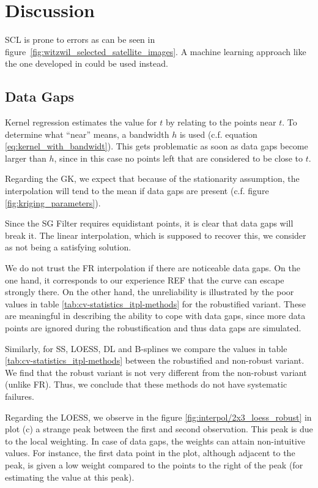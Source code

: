 \chapter{Discussion}

    SCL is prone to errors as can be seen in figure~\ref{fig:witzwil_selected_satellite_images}. A machine learning approach like the one developed in \cite{raiyaniSentinel2ImageScene2021} could be used instead.

\section{Data Gaps}\label{sec:discussion_itpl_data_gaps}

Kernel regression estimates the value for $t$ by relating to the points near $t$. To determine what ``near'' means, a bandwidth $h$ is used (c.f. equation \ref{eq:kernel_with_bandwidt}). This gets problematic as soon as data gaps become larger than $h$, since in this case no points left that are considered to be close to $t$. 

Regarding the GK, we expect that because of the stationarity assumption, the interpolation will tend to the mean if data gaps are present (c.f. figure \ref{fig:kriging_parameters}). 

Since the SG Filter requires equidistant points, it is clear that data gaps will break it. The linear interpolation, which is supposed to recover this, we consider as not being a satisfying solution.

We do not trust the FR interpolation if there are noticeable data gaps. On the one hand, it corresponds to our experience REF that the curve can escape strongly there. On the other hand, the unreliability is illustrated by the poor values in table \ref{tab:cv-statistics_itpl-methods} for the robustified variant. These are meaningful in describing the ability to cope with data gaps, since more data points are ignored during the robustification and thus data gaps are simulated. 

Similarly, for SS, LOESS, DL and B-splines we compare the values in table \ref{tab:cv-statistics_itpl-methods} between the robustified and non-robust variant. We find that the robust variant is not very different from the non-robust variant (unlike FR). Thus, we conclude that these methods do not have systematic failures.

Regarding the LOESS, we observe in the figure \ref{fig:interpol/2x3_loess_robust} in plot (c) a strange peak between the first and second observation. This peak is due to the local weighting. In case of data gaps, the weights can attain non-intuitive values. For instance, the first data point in the plot, although adjacent to the peak, is given a low weight compared to the points to the right of the peak (for estimating the value at this peak).


